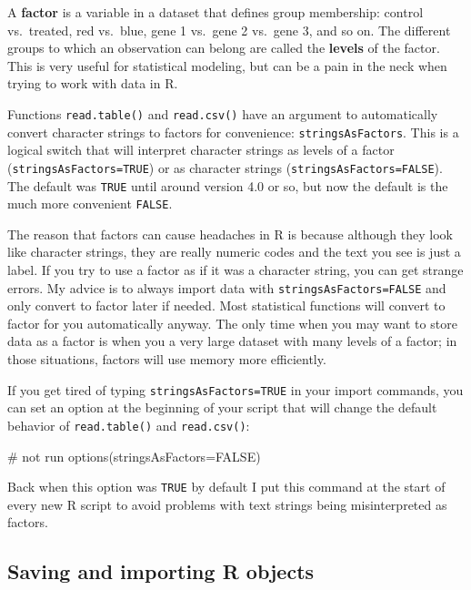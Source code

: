 \documentclass[
  13,
  letterpaper,
]{report}
\newenvironment{Shaded}{\begin{snugshade}}{\end{snugshade}}
\newcommand{\AttributeTok}[1]{\textcolor[rgb]{0.40,0.45,0.13}{#1}}
\newcommand{\CommentTok}[1]{\textcolor[rgb]{0.37,0.37,0.37}{#1}}
\newcommand{\ConstantTok}[1]{\textcolor[rgb]{0.56,0.35,0.01}{#1}}
\newcommand{\FunctionTok}[1]{\textcolor[rgb]{0.28,0.35,0.67}{#1}}
\newcommand{\NormalTok}[1]{\textcolor[rgb]{0.00,0.23,0.31}{#1}}
\begin{document}
A \textbf{factor} is a variable in a dataset that defines group
membership: control vs.~treated, red vs.~blue, gene 1 vs.~gene 2
vs.~gene 3, and so on. The different groups to which an observation can
belong are called the \textbf{levels} of the factor. This is very useful
for statistical modeling, but can be a pain in the neck when trying to
work with data in R.

Functions \texttt{read.table()} and \texttt{read.csv()} have an argument
to automatically convert character strings to factors for convenience:
\texttt{stringsAsFactors}. This is a logical switch that will interpret
character strings as levels of a factor (\texttt{stringsAsFactors=TRUE})
or as character strings (\texttt{stringsAsFactors=FALSE}). The default
was \texttt{TRUE} until around version 4.0 or so, but now the default is
the much more convenient \texttt{FALSE}.

The reason that factors can cause headaches in R is because although
they look like character strings, they are really numeric codes and the
text you see is just a label. If you try to use a factor as if it was a
character string, you can get strange errors. My advice is to always
import data with \texttt{stringsAsFactors=FALSE} and only convert to
factor later if needed. Most statistical functions will convert to
factor for you automatically anyway. The only time when you may want to
store data as a factor is when you a very large dataset with many levels
of a factor; in those situations, factors will use memory more
efficiently.

If you get tired of typing \texttt{stringsAsFactors=TRUE} in your import
commands, you can set an option at the beginning of your script that
will change the default behavior of \texttt{read.table()} and
\texttt{read.csv()}:

\begin{Shaded}
\begin{Highlighting}[]
\CommentTok{\# not run}
\FunctionTok{options}\NormalTok{(}\AttributeTok{stringsAsFactors=}\ConstantTok{FALSE}\NormalTok{)}
\end{Highlighting}
\end{Shaded}

Back when this option was \texttt{TRUE} by default I put this command at
the start of every new R script to avoid problems with text strings
being misinterpreted as factors.

\subsection{Saving and importing R objects}\label{sec-04-import-object}
\end{document}

